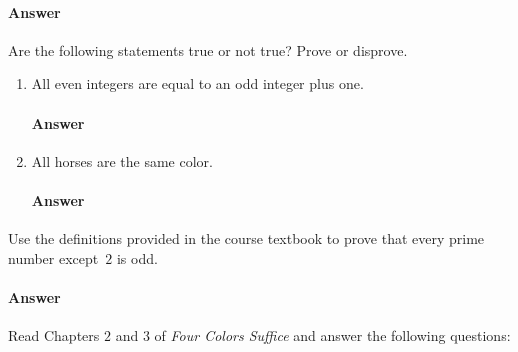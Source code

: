 \documentclass{article}
\begin{document}
\paragraph{Answer}


\collab{\todo{}}

Are the following statements true or not true?    Prove or disprove.

\begin{enumerate}

    \item All even integers are equal to an odd integer plus one.

        \paragraph{Answer}

    \item All horses are the same color.

        \paragraph{Answer}

\end{enumerate}

 
Use the definitions provided in the course textbook to prove that every prime
number except~$2$ is odd.

\paragraph{Answer}


\collab{\todo{}}
Read Chapters $2$ and $3$ of \emph{Four Colors Suffice} and answer the following questions:
\end{document}

